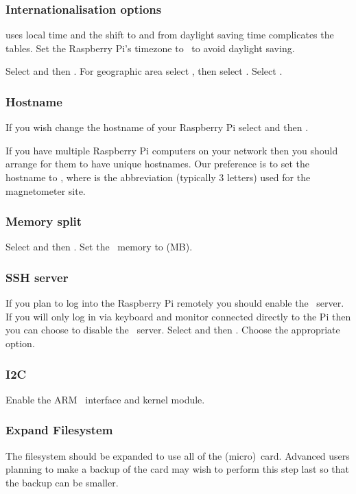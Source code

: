 \subsubsection{Internationalisation options}
 uses local time and the shift to and from daylight
saving time complicates the  tables. Set the Raspberry
Pi's timezone to \utc\ to avoid daylight saving.

Select  and
then . For geographic area select %
, then select \code{\utc}. Select .

\subsubsection{Hostname} 

If you wish change the hostname of your Raspberry Pi select
 and then .

If you have multiple Raspberry Pi computers on your network then you
should arrange for them to have unique hostnames. Our preference is to
set the hostname to , where  is the
abbreviation (typically 3 letters) used for the magnetometer site.

\subsubsection{Memory split}
Select  and then . Set the \gpu\ memory to  (MB).

\subsubsection{SSH server}
If you plan to log into the Raspberry Pi remotely you should enable
the \ssh\ server. If you will only log in via keyboard and monitor
connected directly to the Pi then you can choose to disable the \ssh\
server.
Select  and then . Choose the
appropriate option.

\subsubsection{I2C}
Enable the ARM \itwoc\ interface and kernel module.

\subsubsection{Expand Filesystem}
The filesystem should be expanded to use all of the (micro)\sd\
card. Advanced users planning to make a backup of the card may wish to
perform this step last so that the backup can be smaller.

